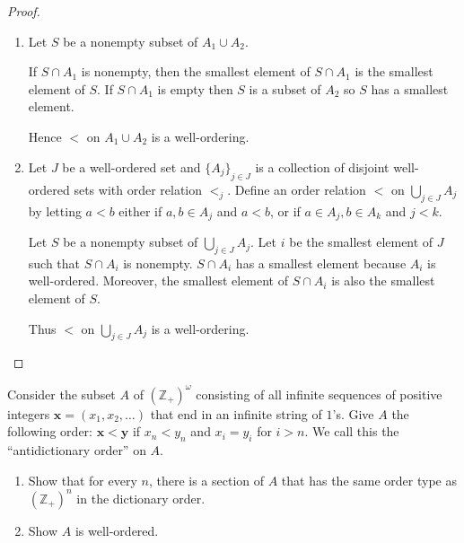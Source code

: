 \begin{proof}
    \begin{enumerate}[label={(\alph*)}]
        \item Let $S$ be a nonempty subset of $A_{1}\cup A_{2}$.

              If $S\cap A_{1}$ is nonempty, then the smallest element of $S\cap A_{1}$ is the smallest element of $S$. If $S\cap A_{1}$ is empty then $S$ is a subset of $A_{2}$ so $S$ has a smallest element.

              Hence $<$ on $A_{1}\cup A_{2}$ is a well-ordering.
        \item Let $J$ be a well-ordered set and ${\{ A_{j} \}}_{j\in J}$ is a collection of disjoint well-ordered sets with order relation $<_{j}$. Define an order relation $<$ on $\bigcup_{j\in J}A_{j}$ by letting $a < b$ either if $a, b\in A_{j}$ and $a < b$, or if $a\in A_{j}, b\in A_{k}$ and $j < k$.

              Let $S$ be a nonempty subset of $\bigcup_{j\in J}A_{j}$. Let $i$ be the smallest element of $J$ such that $S\cap A_{i}$ is nonempty. $S\cap A_{i}$ has a smallest element because $A_{i}$ is well-ordered. Moreover, the smallest element of $S\cap A_{i}$ is also the smallest element of $S$.

              Thus $<$ on $\bigcup_{j\in J}A_{j}$ is a well-ordering.
    \end{enumerate}
\end{proof}

\begin{exercise}\label{chapter1:section10:exercise9}
    Consider the subset $A$ of ${(\mathbb{Z}_{+})}^{\omega}$ consisting of all infinite sequences of positive integers $\mathbf{x} = (x_{1}, x_{2}, \ldots)$ that end in an infinite string of $1$'s. Give $A$ the following order: $\mathbf{x} < \mathbf{y}$ if $x_{n} < y_{n}$ and $x_{i} = y_{i}$ for $i > n$. We call this the ``antidictionary order'' on $A$.
    \begin{enumerate}[label={(\alph*)}]
        \item Show that for every $n$, there is a section of $A$ that has the same order type as ${(\mathbb{Z}_{+})}^{n}$ in the dictionary order.
        \item Show $A$ is well-ordered.
    \end{enumerate}
\end{exercise}

